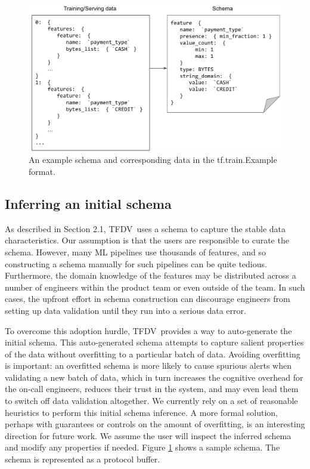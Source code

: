 \documentclass[11pt]{article}
\newcommand{\tfdv}{{\sf TFDV}}
\begin{document}
\begin{figure}[t]
  \includegraphics[width=\linewidth]{submissions/continuous-pipelines/figs/schemainfer1.png}
  \caption{An example schema and corresponding data in the tf.train.Example format.}
  \label{schema}
\vspace{-4mm}
\end{figure}

\newpage
\subsection{Inferring an initial schema} As described in Section 2.1, \tfdv\ uses a schema to capture the stable data characteristics. Our assumption
is that the users are responsible to curate the schema. However, many ML pipelines use thousands of features, and so constructing a schema manually for such pipelines can be quite tedious. Furthermore, the domain knowledge of the features may be distributed across a number of engineers within the product team or
even outside of the team. In such cases, the upfront effort in schema construction can discourage engineers from setting up data validation until they run into a serious data error.

To overcome this adoption hurdle, \tfdv\ provides a way to auto-generate the initial schema. This auto-generated schema attempts to capture salient properties of the data without overfitting to a particular batch of data. Avoiding overfitting is important: an overfitted schema is more likely to cause spurious alerts when validating a new batch of data, which in turn increases the cognitive overhead for the on-call engineers, reduces their trust in the system, and may even lead them to switch off data validation altogether. We currently rely on a set of reasonable heuristics to perform this initial schema inference. A more formal solution, perhaps with guarantees or controls on the amount of overfitting, is an interesting direction for future work. We assume the user will inspect the inferred schema and modify any properties if needed. Figure \ref{schema} shows a sample schema. The schema is represented as a protocol buffer.
\end{document}
